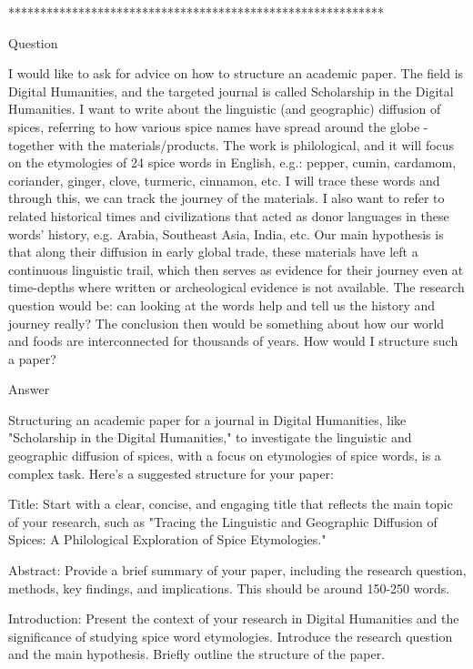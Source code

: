 \documentclass{dsh} %
\begin{document}
***********************************************************

Question

I would like to ask for advice on how to structure an academic paper. The field is Digital Humanities, and the targeted journal is called Scholarship in the Digital Humanities. I want to write about the linguistic (and geographic) diffusion of spices, referring to how various spice names have spread around the globe - together with the materials/products. The work is philological, and it will focus on the etymologies of 24 spice words in English, e.g.: pepper, cumin, cardamom, coriander, ginger, clove, turmeric, cinnamon, etc. I will trace these words and through this, we can track the journey of the materials. I also want to refer to related historical times and civilizations that acted as donor languages in these words' history, e.g. Arabia, Southeast Asia, India, etc. Our main hypothesis is that along their diffusion in early global trade, these materials have left a continuous linguistic trail, which then serves as evidence for their journey even at time-depths where written or archeological evidence is not available. The research question would be: can looking at the words help and tell us the history and journey really? The conclusion then would be something about how our world and foods are interconnected for thousands of years. How would I structure such a paper?

Answer

Structuring an academic paper for a journal in Digital Humanities, like "Scholarship in the Digital Humanities," to investigate the linguistic and geographic diffusion of spices, with a focus on etymologies of spice words, is a complex task. Here's a suggested structure for your paper:

    Title: Start with a clear, concise, and engaging title that reflects the main topic of your research, such as "Tracing the Linguistic and Geographic Diffusion of Spices: A Philological Exploration of Spice Etymologies."

    Abstract: Provide a brief summary of your paper, including the research question, methods, key findings, and implications. This should be around 150-250 words.

    Introduction:
        Present the context of your research in Digital Humanities and the significance of studying spice word etymologies.
        Introduce the research question and the main hypothesis.
        Briefly outline the structure of the paper.
\end{document}
